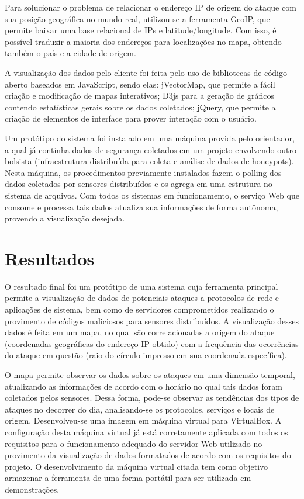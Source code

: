 \documentclass[%
        Portuguese,%
        ]
{ic-tese-v2}
\begin{document}
Para solucionar o problema de relacionar o endereço IP de origem do ataque com sua posição geográfica no mundo real, utilizou-se a ferramenta GeoIP, que permite baixar uma base relacional de IPs e latitude/longitude. Com isso, é possível traduzir a maioria dos endereços para localizações no mapa, obtendo também o país e a cidade de origem.

A visualização dos dados pelo cliente foi feita pelo uso de bibliotecas de có́digo aberto baseados em JavaScript, sendo elas: jVectorMap, que permite a fácil criação e modificação de mapas interativos; D3js para a geração de gráficos contendo estatísticas gerais sobre os dados coletados; jQuery, que permite a criação de elementos de interface para prover interação com o usuário.

Um protótipo do sistema foi instalado em uma máquina provida pelo orientador, a qual já continha dados de segurança coletados em um projeto envolvendo outro bolsista (infraestrutura distribuída para coleta e análise de dados de honeypots). Nesta máquina, os procedimentos previamente instalados fazem o polling dos dados coletados por sensores distribuídos e os agrega em uma estrutura no sistema de arquivos. Com todos os sistemas em funcionamento, o serviço Web que consome e processa tais dados atualiza sua informações de forma autônoma, provendo a visualização desejada.

\chapter{Resultados}
O resultado final foi um protótipo de uma sistema cuja ferramenta principal permite a visualização de dados de potenciais ataques a protocolos de rede e aplicações de sistema, bem como de servidores comprometidos realizando o provimento de có́digos maliciosos para sensores distribuídos. A visualização desses dados é feita em um mapa, no qual são correlacionadas a origem do ataque (coordenadas geográficas do endereço IP obtido) com a frequência das ocorrências do ataque em questão (raio do círculo impresso em sua coordenada específica).

O mapa permite observar os dados sobre os ataques em uma dimensão temporal, atualizando as informações de acordo com o horário no qual tais dados foram coletados pelos sensores. Dessa forma, pode-se observar as tendências dos tipos de ataques no decorrer do dia, analisando-se os protocolos, serviços e locais de origem.
Desenvolveu-se uma imagem em máquina virtual para VirtualBox. A configuração desta máquina virtual já está corretamente aplicada com todos os requisitos para o funcionamento adequado do servidor Web utilizado no provimento da visualização de dados formatados de acordo com os requisitos do projeto. O desenvolvimento da máquina virtual citada tem como objetivo armazenar a ferramenta de uma forma portátil para ser utilizada em demonstrações. 
\end{document}
